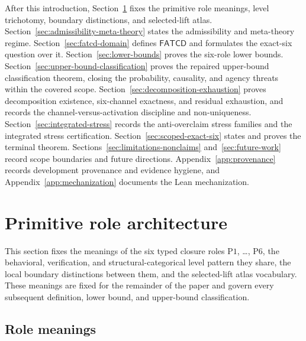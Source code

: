 \documentclass[11pt]{article}
\theoremstyle{definition}
\newcommand{\FATCD}{\ensuremath{\mathsf{FATCD}}}
\newcommand{\Pone}{\ensuremath{\mathrm{P1}}}
\newcommand{\Psix}{\ensuremath{\mathrm{P6}}}
\begin{document}
After this introduction, Section~\ref{sec:primitive-role-architecture}
fixes the primitive role meanings, level trichotomy, boundary
distinctions, and selected-lift atlas. Section~\ref{sec:admissibility-meta-theory}
states the admissibility and meta-theory regime. Section~\ref{sec:fatcd-domain}
defines \FATCD{} and formulates the exact-six question over it.
Section~\ref{sec:lower-bounds} proves the six-role lower bounds.
Section~\ref{sec:upper-bound-classification} proves the repaired
upper-bound classification theorem, closing the probability,
causality, and agency threats within the covered scope.
Section~\ref{sec:decomposition-exhaustion} proves decomposition
existence, six-channel exactness, and residual exhaustion, and records
the channel-versus-activation discipline and non-uniqueness.
Section~\ref{sec:integrated-stress} records the anti-overclaim stress
families and the integrated stress certification.
Section~\ref{sec:scoped-exact-six} states and proves the terminal
theorem. Sections~\ref{sec:limitations-nonclaims}
and~\ref{sec:future-work} record scope boundaries and future
directions. Appendix~\ref{app:provenance} records development provenance and
evidence hygiene, and Appendix~\ref{app:mechanization} documents the
Lean mechanization.
 \section{Primitive role architecture}\label{sec:primitive-role-architecture}



This section fixes the meanings of the six typed closure roles
\Pone{}, \ldots, \Psix{}, the behavioral, verification, and
structural-categorical level pattern they share, the local boundary
distinctions between them, and the selected-lift atlas vocabulary.
These meanings are fixed for the remainder of the paper and govern
every subsequent definition, lower bound, and upper-bound
classification.

\subsection{Role meanings}\label{subsec:role-meanings}
\end{document}
